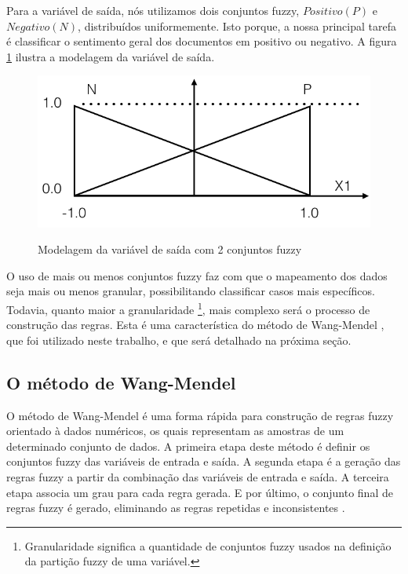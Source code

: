 \documentclass[template.tex]{subfiles}
\begin{document}
Para a variável de saída, nós utilizamos dois conjuntos fuzzy, $Positivo (P)$ e $Negativo (N)$, distribuídos uniformemente. Isto porque, a nossa principal tarefa é classificar o sentimento geral dos documentos em positivo ou negativo. A figura \ref{figura:conjuntos_fuzzy_saida} ilustra a modelagem da variável de saída.

\begin{figure}[H]
\caption{Modelagem da variável de saída com 2 conjuntos fuzzy}
\centering
\includegraphics[scale=0.45]{conjuntos_fuzzy_saida.png}
\label{figura:conjuntos_fuzzy_saida}
\end{figure}

O uso de mais ou menos conjuntos fuzzy faz com que o mapeamento dos dados seja mais ou menos granular, possibilitando classificar casos mais específicos. Todavia, quanto maior a granularidade  \footnote{Granularidade significa a quantidade de conjuntos fuzzy usados na definição da partição fuzzy de uma variável.}, mais complexo será o processo de construção das regras. Esta é uma característica do método de Wang-Mendel \cite{wang1992generating}, que foi utilizado neste trabalho, e que será detalhado na próxima seção.

\subsection{O método de Wang-Mendel}
\label{metodo-wang-mendel}

O método de Wang-Mendel é uma forma rápida para construção de regras fuzzy orientado à dados numéricos, os quais representam as amostras de um determinado conjunto de dados. A primeira etapa deste método é definir os conjuntos fuzzy das variáveis de entrada e saída. A segunda etapa é a geração das regras fuzzy a partir da combinação das variáveis de entrada e saída. A terceira etapa associa um grau para cada regra gerada. E por último, o conjunto final de regras fuzzy é gerado, eliminando as regras repetidas e inconsistentes \cite{wang1992generating}.
\end{document}
